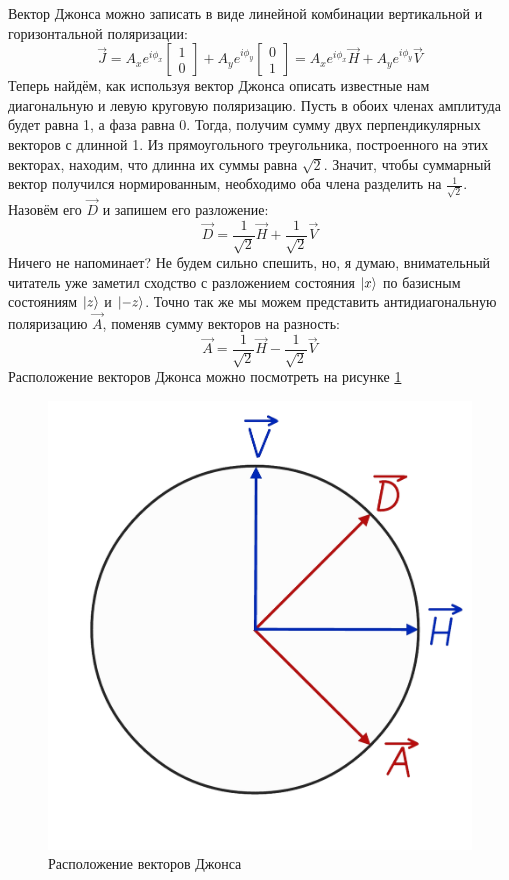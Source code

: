 Вектор Джонса можно записать в виде линейной комбинации вертикальной и горизонтальной поляризации:
\[
\Vec{J} = A_x e^{i\phi_x}\begin{bmatrix} 1 \\ 0 \end{bmatrix} + A_y e^{i\phi_y}\begin{bmatrix} 0 \\ 1 \end{bmatrix} = A_x e^{i\phi_x}\Vec{H} + A_y e^{i\phi_y}\Vec{V}
\]
Теперь найдём, как используя вектор Джонса описать известные нам диагональную и левую круговую поляризацию. Пусть в обоих членах амплитуда будет равна 1, а фаза равна 0. Тогда, получим сумму двух перпендикулярных векторов с длинной 1. Из прямоугольного треугольника, построенного на этих векторах, находим, что длинна их суммы равна $\sqrt{2}$. Значит, чтобы суммарный вектор получился нормированным, необходимо оба члена разделить на $\frac{1}{\sqrt{2}}$. Назовём его $\Vec{D}$ и запишем его разложение:
\[
\Vec{D} = \frac{1}{\sqrt{2}}\Vec{H} + \frac{1}{\sqrt{2}}\Vec{V}
\]
Ничего не напоминает? Не будем сильно спешить, но, я думаю, внимательный читатель уже заметил сходство с разложением состояния $\ket{x}$ по базисным состояниям $\ket{z}$ и $\ket{-z}$. Точно так же мы можем представить антидиагональную поляризацию $\Vec{A}$, поменяв сумму векторов на разность:
\[
\Vec{A} = \frac{1}{\sqrt{2}}\Vec{H} - \frac{1}{\sqrt{2}}\Vec{V}
\]
Расположение векторов Джонса можно посмотреть на рисунке \ref{fig B.5}
\begin{figure}[!ht]
\centering
\includegraphics[scale=0.23]{appendix/images/pol phys space.png}
\caption{Расположение векторов Джонса}
\label{fig B.5}
\end{figure}

